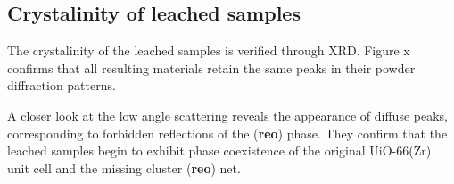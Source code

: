 
\subsection{Crystalinity of leached samples}\label{def:xrd}

The crystalinity of the leached samples is verified through 
XRD. Figure x \todo{} confirms that all resulting materials
retain the same peaks in their powder diffraction patterns.

A closer look at the low angle scattering reveals the 
appearance of diffuse peaks, corresponding to forbidden
reflections of the (\textbf{reo}) phase. They confirm that the 
leached samples begin to exhibit phase coexistence of 
the original UiO-66(Zr) unit cell and the missing cluster
(\textbf{reo}) net. 